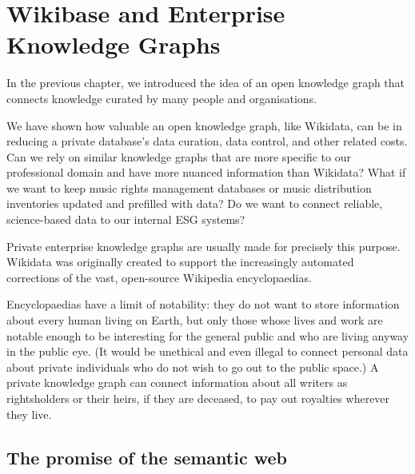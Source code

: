 \documentclass[
  letterpaper,
  DIV=11,
  numbers=noendperiod]{scrreprt}
\begin{document}

\chapter{Wikibase and Enterprise Knowledge Graphs}\label{sec-wikibase}

In the previous chapter, we introduced the idea of an open knowledge
graph that connects knowledge curated by many people and organisations.

We have shown how valuable an open knowledge graph, like Wikidata, can
be in reducing a private database's data curation, data control, and
other related costs. Can we rely on similar knowledge graphs that are
more specific to our professional domain and have more nuanced
information than Wikidata? What if we want to keep music rights
management databases or music distribution inventories updated and
prefilled with data? Do we want to connect reliable, science-based data
to our internal ESG systems?

Private enterprise knowledge graphs are usually made for precisely this
purpose. Wikidata was originally created to support the increasingly
automated corrections of the vast, open-source Wikipedia encyclopaedias.

Encyclopaedias have a limit of notability: they do not want to store
information about every human living on Earth, but only those whose
lives and work are notable enough to be interesting for the general
public and who are living anyway in the public eye. (It would be
unethical and even illegal to connect personal data about private
individuals who do not wish to go out to the public space.) A private
knowledge graph can connect information about all writers as
rightsholders or their heirs, if they are deceased, to pay out royalties
wherever they live.

\section{The promise of the semantic
web}\label{the-promise-of-the-semantic-web}
\end{document}
